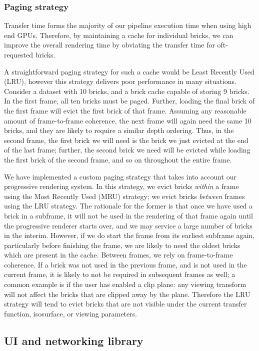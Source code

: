 \subsubsection{Paging strategy}

Transfer time forms the majority of our pipeline execution time when
using high end GPUs. Therefore, by maintaining a cache for individual
bricks, we can improve the overall rendering time by obviating the
transfer time for oft-requested bricks.

A straightforward paging strategy for such a cache would
be Least Recently Used (LRU), however this strategy delivers
poor performance in many situations. Consider a dataset
with 10 bricks, and a brick cache capable of storing 9 bricks.
In the first frame, all ten bricks must be paged. Further, loading
the final brick of the first frame will evict the first brick
of that frame. Assuming any reasonable amount of frame-to-frame
coherence, the next frame will again need the same 10
bricks, and they are likely to require a similar depth ordering.
Thus, in the second frame, the first brick we will need
is the brick we just evicted at the end of the last frame; further,
the second brick we need will be evicted while loading
the first brick of the second frame, and so on throughout the
entire frame.

We have implemented a custom paging strategy that
takes into account our progressive rendering system. In this
strategy, we evict bricks \emph{within} a frame using the Most Recently
Used (MRU) strategy; we evict bricks \emph{between} frames using the
LRU strategy. The rationale for the former is that once we have used a
brick in a subframe, it will not be used in the rendering of that frame
again until the progressive renderer starts over, and we may service
a large number of bricks in the interim. However, if we do start the
frame from its earliest subframe again, particularly before finishing
the frame, we are likely to need the oldest bricks which are present
in the cache. Between frames, we rely on frame-to-frame coherence. If
a brick was not used in the previous frame, and is not used in the
current frame, it is likely to not be required in subsequent frames as
well; a common example is if the user has enabled a clip plane: any
viewing transform will not affect the bricks that are clipped away by
the plane. Therefore the LRU strategy will tend to evict bricks that
are not visible under the current transfer function, isosurface, or
viewing parameters.

\subsection{UI and networking library}

